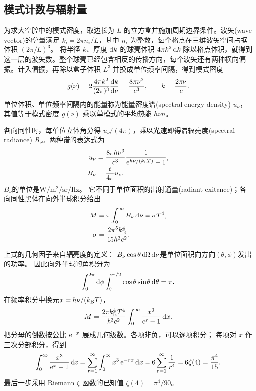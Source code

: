 \subsection{模式计数与辐射量}
\label{ss:radiation-density}

为求大空腔中的模式密度，取边长为 $L$ 的立方盒并施加周期边界条件。波矢(wave vector)的分量满足 $k_i = 2\pi n_i/L$，其中 $n_i$ 为整数，每个格点在三维波矢空间占据体积 $(2\pi/L)^3$。
将半径 $k$、厚度 $\mathop{}\!\mathrm{d} k$ 的球壳体积 $4\pi k^2\mathop{}\!\mathrm{d} k$ 除以格点体积，就得到这一层的波矢数。整个球壳已经包含相反的传播方向，每个波矢还有两种横向偏振。计入偏振，再除以盒子体积 $L^3$ 并换成单位频率间隔，得到模式密度
\begin{equation}
    g(\nu) = 2\frac{4\pi k^2}{(2\pi)^3}\frac{\mathop{}\!\mathrm{d} k}{\mathrm{d}\nu}
    = \frac{8\pi\nu^2}{c^3},\qquad k = \frac{2\pi\nu}{c}.
\end{equation}
单位体积、单位频率间隔内的能量称为能量密度谱(spectral energy density) $u_\nu$，其值等于模式密度 $g(\nu)$ 乘以单模式的平均热能 $h\nu\bar n$。

各向同性时，每单位立体角分得 $u_\nu/(4\pi)$，乘以光速即得谱辐亮度(spectral radiance) $B_\nu$。两种谱的表达式为
\begin{subequations}
    \begin{align}
        u_\nu &= \frac{8\pi h\nu^3}{c^3}\frac1{\mathop{}\!\mathrm{e}^{h\nu/(k_{\mathrm{B}} T)} - 1},\\
        B_\nu &= \frac{c}{4\pi}u_\nu.
    \end{align}
\end{subequations}
$B_\nu$的单位是$\unit{\watt\per\metre\squared\per\steradian\per\hertz}$。
它不同于单位面积的出射通量(radiant exitance)；各向同性黑体在向外半球积分给出
\begin{subequations}
    \begin{align}
        M &= \pi\int_0^\infty B_\nu\mathop{}\!\mathrm{d}\nu
        = \sigma T^4,\\
        \sigma &= \frac{2\pi^5k_{\mathrm{B}}^4}{15h^3c^2}.
    \end{align}
\end{subequations}

上式的几何因子来自辐亮度的定义：
$B_\nu\cos\theta\mathop{}\!\mathrm{d}\Omega\mathop{}\!\mathrm{d}\nu$是单位面积向方向$(\theta,\phi)$发出的功率。
因此向外半球的角积分为
\begin{equation}
    \int_0^{2\pi}\mathop{}\!\mathrm{d}\phi\int_0^{\pi/2}
    \cos\theta\sin\theta\mathop{}\!\mathrm{d}\theta = \pi.
\end{equation}
在频率积分中换元$x = h\nu/(k_{\mathrm{B}} T)$，
\begin{equation}
    M = \frac{2\pi k_{\mathrm{B}}^4T^4}{h^3c^2}
    \int_0^\infty\frac{x^3}{\mathop{}\!\mathrm{e}^x - 1}\mathop{}\!\mathrm{d} x.
\end{equation}
把分母的倒数按公比 $\mathop{}\!\mathrm{e}^{-x}$ 展成几何级数。各项非负，可以逐项积分；
每项对 $x$ 作三次分部积分，得到
\begin{equation}\label{eq:qm-planck-integral}
    \int_0^\infty\frac{x^3}{\mathop{}\!\mathrm{e}^x - 1}\mathop{}\!\mathrm{d} x
    = \sum_{r=1}^\infty\int_0^\infty x^3\mathop{}\!\mathrm{e}^{-rx}\mathop{}\!\mathrm{d} x
    = 6\sum_{r=1}^\infty\frac1{r^4}
    = 6\zeta(4) = \frac{\pi^4}{15}.
\end{equation}
最后一步采用 Riemann $\zeta$ 函数的已知值 $\zeta(4) = \pi^4/90$。

